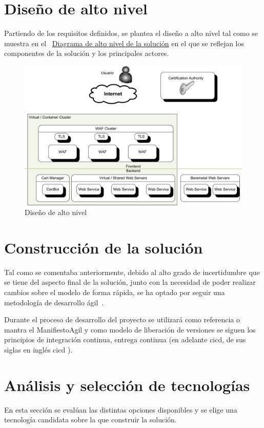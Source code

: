 \section{Diseño de alto nivel}
\par Partiendo de los requisitos definidos, se plantea el diseño a alto nivel tal como se muestra en el {~\hyperref[fig:hld]{Diagrama de alto nivel de la solución}} en el que se reflejan los componentes de la solución y
los principales actores.
\begin{figure}[h!]
  \centering
  \label{fig:hld}
  \includegraphics[width=\textwidth]{fig/Diagram_HLD}
  \caption{Diseño de alto nivel}
\end{figure}

\section{Construcción de la solución}
\par Tal como se comentaba anteriormente, debido al alto grado de incertidumbre que se tiene del aspecto final de la solución, junto con la necesidad de poder
realizar cambios sobre el modelo de forma rápida, se ha optado por seguir una metodología de desarrollo ágil~\cite{wiki:agil}.
\par Durante el proceso de desarrollo del proyecto se utilizará como referencia o mantra el \Gls{ManifiestoAgil} y como modelo de liberación de versiones se
siguen los principios de integración continua, entrega continua (en adelante \acrshort{cicd}, de sus siglas en inglés \acrlong{cicd} \cite{cicd}).

\section{Análisis y selección de tecnologías}
\par En esta sección se evalúan las distintas opciones disponibles y se elige una tecnología candidata sobre la que construir la solución.
